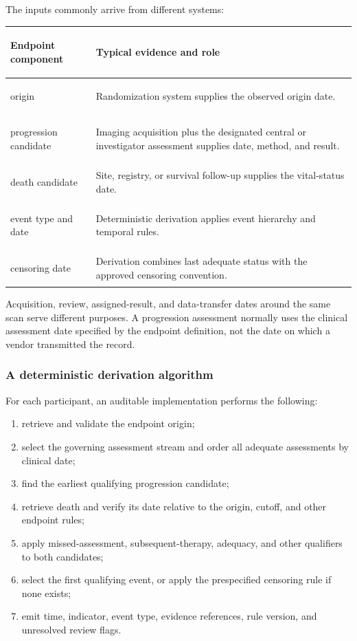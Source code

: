 \documentclass[12pt,oneside]{book}
\numberwithin{equation}{section}
\theoremstyle{definition}
\theoremstyle{plain}
\theoremstyle{remark}
\begin{document}
The inputs commonly arrive from different systems:
\begin{center}
\begin{xltabular}{0.94\textwidth}{>{\bfseries\raggedright\arraybackslash}p{0.25\textwidth}X}
\toprule
Endpoint component & Typical evidence and role \\
\midrule
origin & Randomization system supplies the observed origin date. \\
progression candidate & Imaging acquisition plus the designated central or investigator assessment supplies date, method, and result. \\
death candidate & Site, registry, or survival follow-up supplies the vital-status date. \\
event type and date & Deterministic derivation applies event hierarchy and temporal rules. \\
censoring date & Derivation combines last adequate status with the approved censoring convention. \\
\bottomrule
\end{xltabular}
\end{center}
Acquisition, review, assigned-result, and data-transfer dates around the same
scan serve different purposes.  A progression assessment normally uses the
clinical assessment date specified by the endpoint definition, not the date on
which a vendor transmitted the record.

\subsubsection{A deterministic derivation algorithm}

For each participant, an auditable implementation performs the following:
\begin{enumerate}
    \item retrieve and validate the endpoint origin;
    \item select the governing assessment stream and order all adequate
    assessments by clinical date;
    \item find the earliest qualifying progression candidate;
    \item retrieve death and verify its date relative to the origin, cutoff,
    and other endpoint rules;
    \item apply missed-assessment, subsequent-therapy, adequacy, and other
    qualifiers to both candidates;
    \item select the first qualifying event, or apply the prespecified
    censoring rule if none exists;
    \item emit time, indicator, event type, evidence references, rule version,
    and unresolved review flags.
\end{enumerate}
\end{document}
